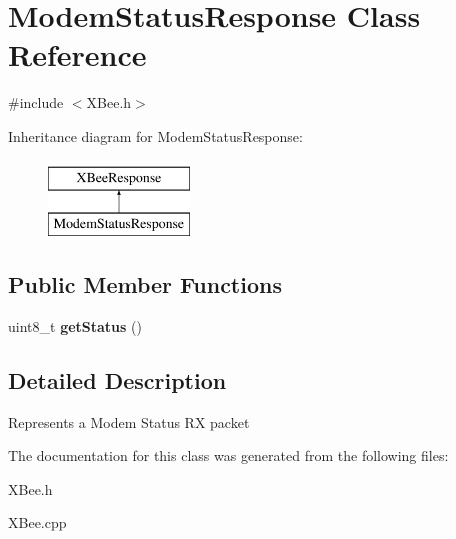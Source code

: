 \hypertarget{classModemStatusResponse}{\section{\-Modem\-Status\-Response \-Class \-Reference}
\label{classModemStatusResponse}
}


{\ttfamily \#include $<$\-X\-Bee.\-h$>$}

\-Inheritance diagram for \-Modem\-Status\-Response\-:\begin{figure}[H]
\begin{center}
\leavevmode
\includegraphics[height=2.000000cm]{classModemStatusResponse}
\end{center}
\end{figure}
\subsection*{\-Public \-Member \-Functions}
\begin{DoxyCompactItemize}
\item 
\hypertarget{classModemStatusResponse_a901244d6313391f60eec7764b10de3aa}{uint8\-\_\-t {\bfseries get\-Status} ()}\label{classModemStatusResponse_a901244d6313391f60eec7764b10de3aa}

\end{DoxyCompactItemize}


\subsection{\-Detailed \-Description}
\-Represents a \-Modem \-Status \-R\-X packet 

\-The documentation for this class was generated from the following files\-:\begin{DoxyCompactItemize}
\item 
\-X\-Bee.\-h\item 
\-X\-Bee.\-cpp\end{DoxyCompactItemize}
